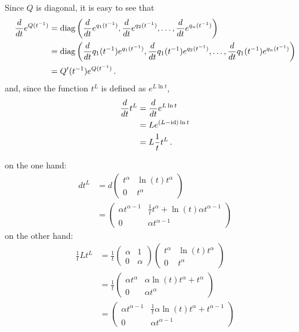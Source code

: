 \begin{rem}
  Since $Q$ is diagonal, it is easy to see that
  \begin{align*}
    \frac{d}{dt}e^{Q(t^{-1})}
    &=\operatorname{diag}\left(\frac{d}{dt}e^{q_1(t^{-1})},\frac{d}{dt}e^{q_2(t^{-1})}
      ,\dots,
      \frac{d}{dt}e^{q_n(t^{-1})}\right)
      \\&=\operatorname{diag}\left(\frac{d}{dt}q_1(t^{-1})e^{q_1(t^{-1})}
                    ,\frac{d}{dt}q_1(t^{-1})e^{q_2(t^{-1})}
                    ,\dots
                    ,\frac{d}{dt}q_1(t^{-1})e^{q_n(t^{-1})}\right)
  \\&=Q'(t^{-1})e^{Q(t^{-1})} \,.
  \end{align*}
  and, since the function $t^L$ is defined as $e^{L\ln t}$,
  \begin{align*}
    \frac{d}{dt}t^L&=\frac{d}{dt}e^{L\ln t}
    \\&=Le^{(L-\operatorname{id})\ln t}
    \\&=L\frac{1}{t}t^L \,.
  \end{align*}
  \begin{s-rem}
    on the one hand:
    \begin{align*}
      dt^L
      &= d\begin{pmatrix}
        t^\alpha & \ln(t)t^\alpha \\ 0 & t^\alpha
      \end{pmatrix}
      \\&=
      \begin{pmatrix}
        \alpha t^{\alpha-1} & \frac{1}{t}t^\alpha+\ln(t)\alpha t^{\alpha-1}
        \\ 0 & \alpha t^{\alpha-1}
      \end{pmatrix}
    \end{align*}
    on the other hand:
    \begin{align*}
      \frac{1}{t}Lt^L
      &= \frac{1}{t}
      \begin{pmatrix}
        \alpha & 1 \\ 0 & \alpha
      \end{pmatrix}
      \begin{pmatrix}
        t^\alpha & \ln(t)t^\alpha \\ 0 & t^\alpha
      \end{pmatrix}
      \\&= \frac{1}{t}
      \begin{pmatrix}
        \alpha t^\alpha & \alpha\ln(t)t^\alpha + t^\alpha
        \\ 0 & \alpha t^\alpha
      \end{pmatrix}
      \\&= 
      \begin{pmatrix}
        \alpha t^{\alpha-1} & \frac{1}{t}\alpha\ln(t)t^\alpha+t^{\alpha-1}
        \\ 0 & \alpha t^{\alpha-1}
      \end{pmatrix}
    \end{align*}
  \end{s-rem}
\end{rem}
